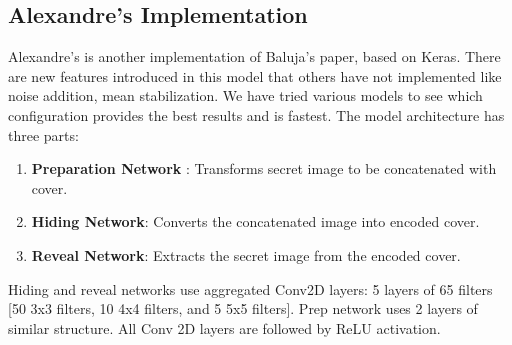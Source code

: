 \documentclass{article}
\begin{document}
\subsection{{ Alexandre's Implementation}} 
Alexandre's is another implementation \cite{alexandre} of Baluja's paper, based on Keras. There are new features introduced in this model that others have not implemented like noise addition, mean stabilization. We have tried various models to see which configuration provides the best results and is fastest. The model architecture has three parts:
\begin{enumerate}
    \item \textbf{Preparation Network} : Transforms secret image to be concatenated with cover.
    \item \textbf{Hiding Network}: Converts the concatenated image into encoded cover.
    \item \textbf{Reveal Network}: Extracts the secret image from the encoded cover.
\end{enumerate}

Hiding and reveal networks use aggregated Conv2D layers: 5 layers of 65 filters [50 3x3 filters, 10 4x4 filters, and 5 5x5 filters]. Prep network uses 2 layers of similar structure. All Conv 2D layers are followed by ReLU activation.

\end{document}
